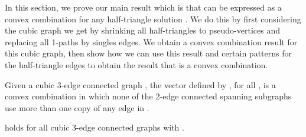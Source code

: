 \documentclass[oneeqnum,final]{siamltex1213}
\begin{document}
In this section, we prove our main result which is that  can be expressed as a convex combination for any half-triangle solution . We do this by first considering the cubic graph we get by shrinking all half-triangles to pseudo-vertices and replacing all 1-paths by singles edges. We obtain a convex combination result for this cubic graph, then show how we can use this result and certain patterns for the half-triangle edges to obtain the result that  is a convex combination.

\begin{definition}
 Given a cubic 3-edge connected graph , the vector  defined by , for all , is a convex combination in which none of the 2-edge connected spanning subgraphs use more than one copy of any edge in .
\end{definition}

\begin{lemma}\label{thmThreeSeventh}
 holds for all cubic 3-edge connected graphs  with .
\end{lemma}
\end{document}
